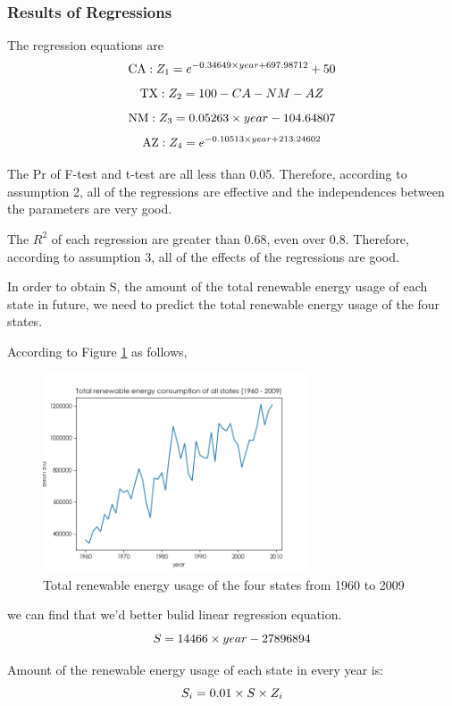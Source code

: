 \documentclass[a4paper,11pt]{article}
\begin{document}
\subsubsection{Results of Regressions}
\par The regression equations are
\begin{equation}
    \centering
\text{CA}:   Z_1=e^{-0.34649 \times year+697.98712}+50
\end{equation}
\begin{equation}
    \centering
\text{TX}:   Z_2=100-CA-NM-AZ
\end{equation}
\begin{equation}
    \centering
\text{NM}:   Z_3=0.05263 \times year-104.64807
\end{equation}
\begin{equation}
    \centering
\text{AZ}:   Z_4=e^{-0.10513 \times year+213.24602}
\end{equation}
\par The Pr of F-test and t-test are all less than 0.05. Therefore, according to assumption 2, all of the regressions are effective and the independences between the parameters are very good.
\par The $R^{2}$ of each regression are greater than 0.68, even over 0.8. Therefore, according to assumption 3, all of the effects of the regressions are good.
\par In order to obtain S, the amount of the total renewable energy usage of each state in future, we need to predict the total renewable energy usage of the four states.
\par According to Figure \ref{fig:D-total-energy} as follows,
\begin{figure}[h]%
    \centering 
    \includegraphics[width=0.7\textwidth]{./Pic/D-total-energy.png}
    \caption{Total renewable energy usage of the four states from 1960 to 2009}
    \label{fig:D-total-energy}  
\end{figure}
we can find that we'd better bulid linear regression equation.
\begin{equation}
    \centering
S=14466 \times year-27896894
\end{equation}
\par Amount of the renewable energy usage of each state in every year is:
\begin{equation}
    \centering
    S_i=0.01 \times S \times Z_i
\end{equation}
\end{document}
